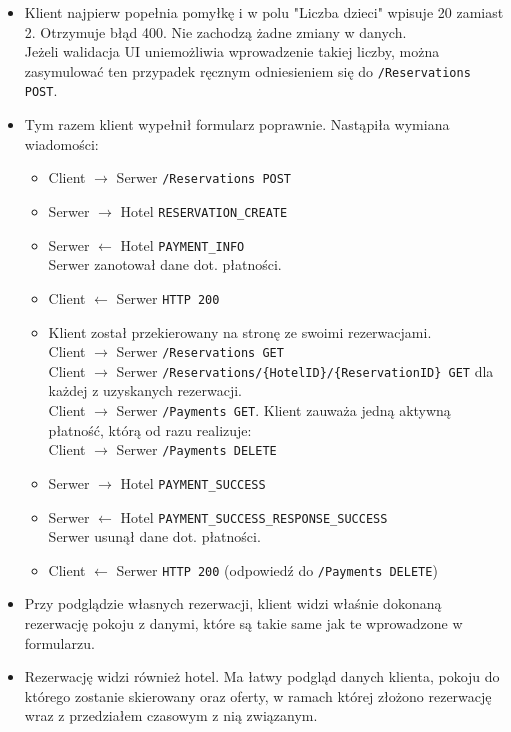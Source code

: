 \documentclass{article}
\begin{document}
\begin{itemize}
    \item Klient najpierw popełnia pomyłkę i w polu "Liczba dzieci" wpisuje 20 zamiast 2. Otrzymuje błąd 400. Nie zachodzą żadne zmiany w danych.\\
    Jeżeli walidacja UI uniemożliwia wprowadzenie takiej liczby, można zasymulować ten przypadek ręcznym odniesieniem się do \texttt{/Reservations POST}.
    \item Tym razem klient wypełnił formularz poprawnie. Nastąpiła wymiana wiadomości:
    \begin{itemize}
        \item Client $\rightarrow$ Serwer \texttt{/Reservations POST}
        \item Serwer $\rightarrow$ Hotel \texttt{RESERVATION\_CREATE}
        \item Serwer $\leftarrow$ Hotel \texttt{PAYMENT\_INFO}\\
        Serwer zanotował dane dot. płatności.
        \item Client $\leftarrow$ Serwer \texttt{HTTP 200}
        \item Klient został przekierowany na stronę ze swoimi rezerwacjami.\\
        Client $\rightarrow$ Serwer \texttt{/Reservations GET}\\
        Client $\rightarrow$ Serwer \texttt{/Reservations/\{HotelID\}/\{ReservationID\} GET} dla każdej z uzyskanych rezerwacji.\\
        Client $\rightarrow$ Serwer \texttt{/Payments GET}. Klient zauważa jedną aktywną płatność, którą od razu realizuje:\\
        Client $\rightarrow$ Serwer \texttt{/Payments DELETE}
        \item Serwer $\rightarrow$ Hotel \texttt{PAYMENT\_SUCCESS}
        \item Serwer $\leftarrow$ Hotel \texttt{PAYMENT\_SUCCESS\_RESPONSE\_SUCCESS}\\
        Serwer usunął dane dot. płatności.
        \item Client $\leftarrow$ Serwer \texttt{HTTP 200} (odpowiedź do \texttt{/Payments DELETE})
    \end{itemize}
    \item Przy podglądzie własnych rezerwacji, klient widzi właśnie dokonaną rezerwację pokoju z danymi, które są takie same jak te wprowadzone w formularzu.
    \item Rezerwację widzi również hotel. Ma łatwy podgląd danych klienta, pokoju do którego zostanie skierowany oraz oferty, w ramach której złożono rezerwację wraz z przedziałem czasowym z nią związanym.
\end{itemize}
\end{document}
